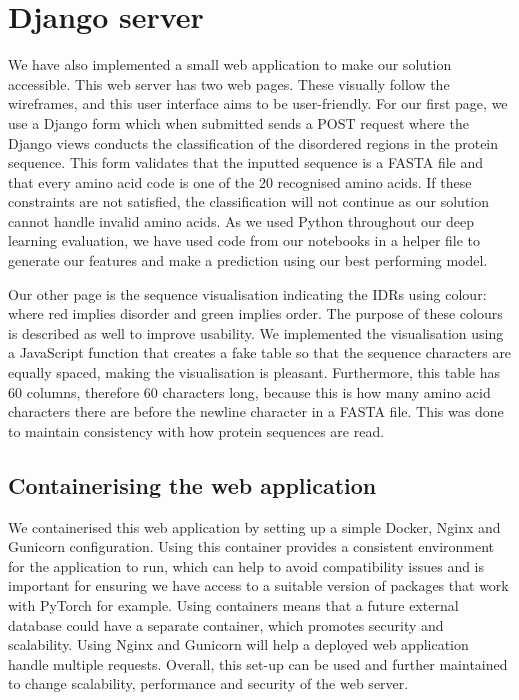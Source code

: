 \documentclass{l4proj}
\begin{document}
\section{Django server}
We have also implemented a small web application to make our solution accessible. This web server has two web pages. These visually follow the wireframes, and this user interface aims to be user-friendly. For our first page, we use a Django form which when submitted sends a POST request where the Django views conducts the classification of the disordered regions in the protein sequence. This form validates that the inputted sequence is a FASTA file and that every amino acid code is one of the 20 recognised amino acids. If these constraints are not satisfied, the classification will not continue as our solution cannot handle invalid amino acids. As we used Python throughout our deep learning evaluation, we have used code from our notebooks in a helper file to generate our features and make a prediction using our best performing model.

Our other page is the sequence visualisation indicating the IDRs using colour: where red implies disorder and green implies order. The purpose of these colours is described as well to improve usability. We implemented the visualisation using a JavaScript function that creates a fake table so that the sequence characters are equally spaced, making the visualisation is pleasant. Furthermore, this table has 60 columns, therefore 60 characters long, because this is how many amino acid characters there are before the newline character in a FASTA file. This was done to maintain consistency with how protein sequences are read.

\subsection{Containerising the web application}

We containerised this web application by setting up a simple Docker, Nginx and Gunicorn configuration. Using this container provides a consistent environment for the application to run, which can help to avoid compatibility issues and is important for ensuring we have access to a suitable version of packages that work with PyTorch for example. Using containers means that a future external database could have a separate container, which promotes security and scalability. Using Nginx and Gunicorn will help a deployed web application handle multiple requests. Overall, this set-up can be used and further maintained to change scalability, performance and security of the web server.
\end{document}
